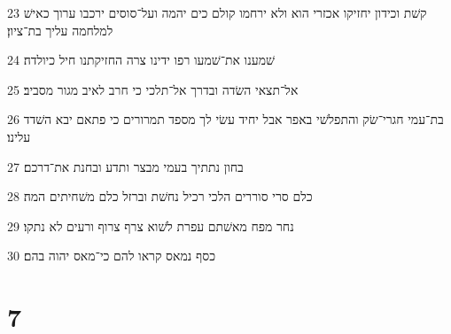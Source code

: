 \par 23 קשׁת וכידון יחזיקו אכזרי הוא ולא ירחמו קולם כים יהמה ועל־סוסים ירכבו ערוך כאישׁ למלחמה עליך בת־ציון׃
\par 24 שׁמענו את־שׁמעו רפו ידינו צרה החזיקתנו חיל כיולדה׃
\par 25 אל־תצאי השׂדה ובדרך אל־תלכי כי חרב לאיב מגור מסביב׃
\par 26 בת־עמי חגרי־שׂק והתפלשׁי באפר אבל יחיד עשׂי לך מספד תמרורים כי פתאם יבא השׁדד עלינו׃
\par 27 בחון נתתיך בעמי מבצר ותדע ובחנת את־דרכם׃
\par 28 כלם סרי סוררים הלכי רכיל נחשׁת וברזל כלם משׁחיתים המה׃
\par 29 נחר מפח מאשׁתם עפרת לשׁוא צרף צרוף ורעים לא נתקו׃
\par 30 כסף נמאס קראו להם כי־מאס יהוה בהם׃

\chapter{7}

